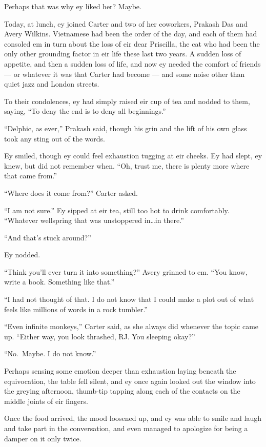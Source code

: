 Perhaps that was why ey liked her? Maybe.

Today, at lunch, ey joined Carter and two of her coworkers, Prakash Das and Avery Wilkins. Vietnamese had been the order of the day, and each of them had consoled em in turn about the loss of eir dear Priscilla, the cat who had been the only other grounding factor in eir life these last two years. A sudden loss of appetite, and then a sudden loss of life, and now ey needed the comfort of friends — or whatever it was that Carter had become — and some noise other than quiet jazz and London streets.

To their condolences, ey had simply raised eir cup of tea and nodded to them, saying, ``To deny the end is to deny all beginnings.''

``Delphic, as ever,'' Prakash said, though his grin and the lift of his own glass took any sting out of the words.

Ey smiled, though ey could feel exhaustion tugging at eir cheeks. Ey had slept, ey knew, but did not remember when. ``Oh, trust me, there is plenty more where that came from.''

``Where does it come from?'' Carter asked.

``I am not sure.'' Ey sipped at eir tea, still too hot to drink comfortably. ``Whatever wellspring that was unstoppered in\ldots in there.''

``And that's stuck around?''

Ey nodded.

``Think you'll ever turn it into something?'' Avery grinned to em. ``You know, write a book. Something like that.''

``I had not thought of that. I do not know that I could make a plot out of what feels like millions of words in a rock tumbler.''

``Even infinite monkeys,'' Carter said, as she always did whenever the topic came up. ``Either way, you look thrashed, RJ. You sleeping okay?''

``No.~Maybe. I do not know.''

Perhaps sensing some emotion deeper than exhaustion laying beneath the equivocation, the table fell silent, and ey once again looked out the window into the greying afternoon, thumb-tip tapping along each of the contacts on the middle joints of eir fingers.

Once the food arrived, the mood loosened up, and ey was able to smile and laugh and take part in the conversation, and even managed to apologize for being a damper on it only twice.

